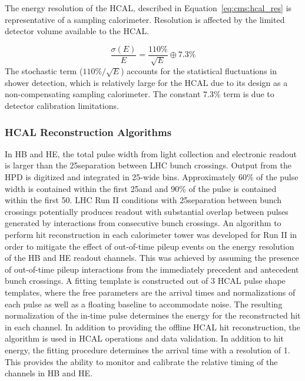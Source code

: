 The energy resolution of the HCAL, described in Equation~\ref{eq:cms:hcal_res} is representative of a sampling calorimeter. Resolution is affected by the limited detector volume available to the HCAL\cite{Cavallari_2011}.

\begin{equation}
\frac{\sigma(E)}{E}=\frac{110\%}{\sqrt{E}} \oplus 7.3\%
\label{eq:cms:hcal_res}
\end{equation}
The stochastic term (${110\%}/\sqrt{E}$) accounts for the statistical fluctuations in shower detection, which is relatively large for the HCAL due to its design as a non-compensating sampling calorimeter. The constant $7.3\%$ term is due to detector calibration limitations.

\subsubsection{HCAL Reconstruction Algorithms}
In HB and HE, the total pulse width from light collection and electronic readout is larger than the 25\ns separation between LHC bunch crossings. Output from the HPD is digitized and integrated in 25\ns-wide bins. Approximately 60\% of the pulse width is contained within the first 25\ns and and 90\% of the pulse is contained within the first 50\ns. LHC Run II conditions with 25\ns separation between bunch crossings potentially produces readout with substantial overlap between pulses generated by interactions from consecutive bunch crossings. An algorithm to perform hit reconstruction in each calorimeter tower was developed for Run II in order to mitigate the effect of out-of-time pileup events on the energy resolution of the HB and HE readout channels. This was achieved by assuming the presence of out-of-time pileup interactions from the immediately precedent and antecedent bunch crossings. A fitting template is constructed out of 3 HCAL pulse shape templates, where the free parameters are the arrival times and normalizations of each pulse as well as a floating baseline to accommodate noise. The resulting normalization of the in-time pulse determines the energy for the reconstructed hit in each channel. 
In addition to providing the offline HCAL hit reconstruction, the algorithm is used in HCAL operations and data validation. In addition to hit energy, the fitting procedure determines the arrival time with a resolution of 1\ns. This provides the ability to monitor and calibrate the relative timing of the channels in HB and HE. 
